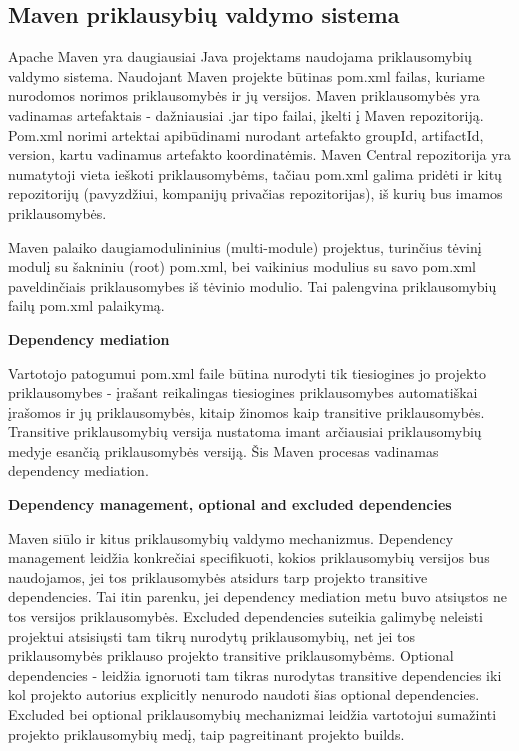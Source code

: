 \subsection{Maven priklausybių valdymo sistema}

Apache Maven yra daugiausiai Java projektams naudojama priklausomybių valdymo sistema. Naudojant Maven projekte būtinas pom.xml failas, kuriame nurodomos norimos priklausomybės ir jų versijos. Maven priklausomybės yra vadinamas artefaktais - dažniausiai .jar tipo failai, įkelti į Maven repozitoriją. Pom.xml norimi artektai apibūdinami nurodant artefakto groupId, artifactId, version, kartu vadinamus artefakto koordinatėmis. Maven Central repozitorija yra numatytoji vieta ieškoti priklausomybėms, tačiau pom.xml galima pridėti ir kitų repozitorijų (pavyzdžiui, kompanijų privačias repozitorijas), iš kurių bus imamos priklausomybės.
\bigbreak

Maven palaiko daugiamodulininius (multi-module) projektus, turinčius tėvinį modulį su šakniniu (root) pom.xml, bei vaikinius modulius su savo pom.xml paveldinčiais priklausomybes iš tėvinio modulio. Tai palengvina priklausomybių failų pom.xml palaikymą.
\bigbreak

{\bf Dependency mediation}
\bigbreak

Vartotojo patogumui pom.xml faile būtina nurodyti tik tiesiogines jo projekto priklausomybes - įrašant reikalingas tiesiogines priklausomybes automatiškai įrašomos ir jų priklausomybės, kitaip žinomos kaip transitive priklausomybės. Transitive priklausomybių versija nustatoma imant arčiausiai priklausomybių medyje esančią priklausomybės versiją. Šis Maven procesas vadinamas dependency mediation.

\bigbreak
{\bf Dependency management, optional and excluded dependencies}
\bigbreak

Maven siūlo ir kitus priklausomybių valdymo mechanizmus. Dependency management leidžia konkrečiai specifikuoti, kokios priklausomybių versijos bus naudojamos, jei tos priklausomybės atsidurs tarp projekto transitive dependencies. Tai itin parenku, jei dependency mediation metu buvo atsiųstos ne tos versijos priklausomybės. Excluded dependencies suteikia galimybę neleisti projektui atsisiųsti tam tikrų nurodytų priklausomybių, net jei tos priklausomybės priklauso projekto transitive priklausomybėms. Optional dependencies - leidžia ignoruoti tam tikras nurodytas transitive dependencies iki kol projekto autorius explicitly nenurodo naudoti šias optional dependencies. Excluded bei optional priklausomybių mechanizmai leidžia vartotojui sumažinti projekto priklausomybių medį, taip pagreitinant projekto builds.

